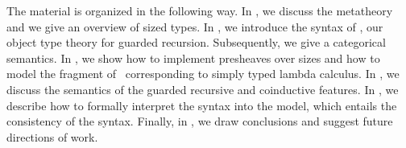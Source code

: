 The material is organized in the following way.
In , we discuss the metatheory and we give an
overview of sized types.
In , we introduce the syntax of \GTT, our object type theory for guarded recursion.
Subsequently, we give a categorical semantics.
In , we show how to implement presheaves over
sizes and how to model the fragment of
\GTT\ corresponding to simply typed lambda calculus.
In , we discuss the semantics of the guarded
recursive and coinductive features.
In , we describe how to formally interpret the
syntax into the model, which entails the consistency of the syntax.
Finally, in , we draw conclusions and suggest  future
directions of work.








